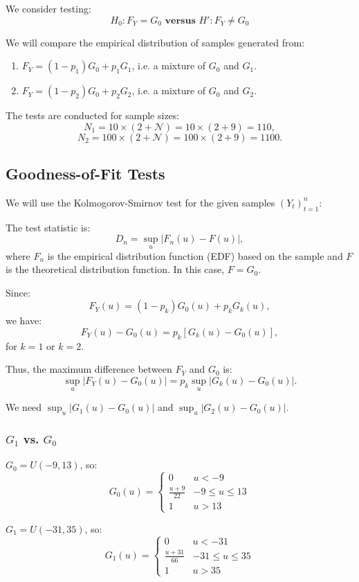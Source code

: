 \documentclass{article}
\begin{document}
We consider testing:
\[
H_0: F_Y = G_0 \textbf{ versus } H': F_Y \neq G_0
\]

We will compare the empirical distribution of samples generated from:

\begin{enumerate}
    \item \(F_Y = (1-p_1)G_0 + p_1 G_1\), i.e. a mixture of \(G_0\) and \(G_1\).
    \item \(F_Y = (1-p_2)G_0 + p_2 G_2\), i.e. a mixture of \(G_0\) and \(G_2\).
\end{enumerate}

The tests are conducted for sample sizes:
\[
N_1 = 10 \times (2+\mathcal{N}) = 10 \times (2+9) = 110,
\]
\[
N_2 = 100 \times (2+\mathcal{N}) = 100 \times (2+9) = 1100.
\]

\subsection{Goodness-of-Fit Tests}

We will use the Kolmogorov-Smirnov test for the given samples \((Y_t)_{t=1}^n\):

The test statistic is:
\[
D_n = \sup_u |F_n(u) - F(u)|,
\]
where \(F_n\) is the empirical distribution function (EDF) based on the sample and \(F\) is the theoretical distribution function. In this case, \(F = G_0\).

Since:
\[
F_Y(u) = (1 - p_k) G_0(u) + p_k G_k(u),
\]
we have:
\[
F_Y(u) - G_0(u) = p_k [G_k(u) - G_0(u)],
\]
for \(k=1\) or \(k=2\).

Thus, the maximum difference between \(F_Y\) and \(G_0\) is:
\[
\sup_u |F_Y(u)-G_0(u)| = p_k \sup_u |G_k(u)-G_0(u)|.
\]

We need \(\sup_u |G_1(u)-G_0(u)|\) and \(\sup_u |G_2(u)-G_0(u)|\).

\subsubsection{\(G_1\) vs. \(G_0\)}

\(G_0 = U(-9, 13)\), so:
\[
G_0(u)=\begin{cases}
0 & u < -9 \\
\frac{u+9}{22} & -9 \le u \le 13 \\
1 & u > 13
\end{cases}
\]

\(G_1 = U(-31,35)\), so:
\[
G_1(u)=\begin{cases}
0 & u < -31 \\
\frac{u+31}{66} & -31 \le u \le 35 \\
1 & u > 35
\end{cases}
\]
\end{document}
